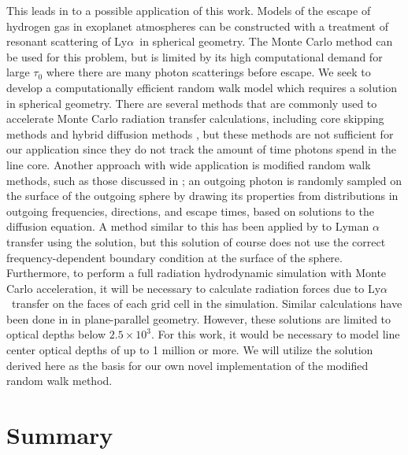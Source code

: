\documentclass[linenumbers]{aastex63}
\newcommand\lya{Ly$\alpha$\ }
\begin{document}
This leads in to a possible application of this work. Models of the escape of hydrogen gas in exoplanet atmospheres can be constructed with a treatment of resonant scattering of \lya in spherical geometry. The Monte Carlo method can be used for this problem, but is limited by its high computational demand for large $\tau_0$ where there are many photon scatterings before escape. We seek to develop a computationally efficient random walk model which requires a solution in spherical geometry. There are several methods that are commonly used to accelerate Monte Carlo radiation transfer calculations, including core skipping methods \citep{1968ApJ...153..783A,2002ApJ...567..922A} and hybrid diffusion methods \citep{2018MNRAS.479.2065S}, but these methods are not sufficient for our application since they do not track the amount of time photons spend in the line core. Another approach with wide application is modified random walk methods, such as those discussed in \citet{1984JCoPh..54..508F, 2009A&A...497..155M, 2010A&A...520A..70R}; an outgoing photon is randomly sampled on the surface of the outgoing sphere by drawing its properties from distributions in outgoing frequencies, directions, and escape times, based on solutions to the diffusion equation. A method similar to this has been applied by \citet{2006ApJ...645..792T} to Lyman $\alpha$ transfer using the \cite{1990ApJ...350..216N} solution, but this solution of course does not use the correct frequency-dependent boundary condition at the surface of the sphere. Furthermore, to perform a full radiation hydrodynamic simulation with Monte Carlo acceleration, it will be necessary to calculate radiation forces due to \lya transfer on the faces of each grid cell in the simulation. Similar calculations have been done in \citet{1976ApJ...208..286W} in plane-parallel geometry. However, these solutions are limited to optical depths below $2.5 \times 10^3$. For this work, it would be necessary to model line center optical depths of up to 1 million or more. We will utilize the solution derived here as the basis for our own novel implementation of the modified random walk method.

\section{Summary}
\end{document}
